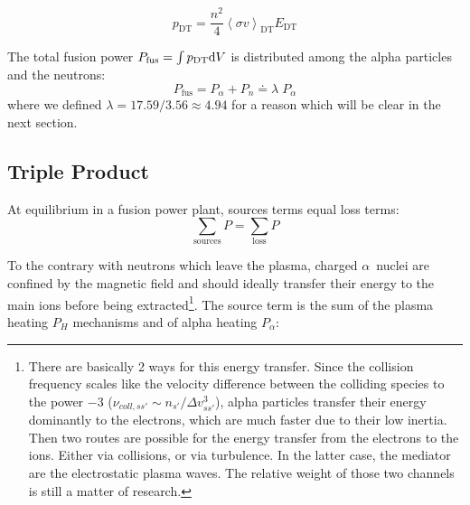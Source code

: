 \begin{equation}
p_{\mathrm{DT}} = 
	\frac{n^2}{4}  \left< \sigma v \right>_{\mathrm{DT}} E_{\mathrm{DT}}
	\label{eq:fusion_power}
\end{equation}

The total fusion power $P_{\mathrm{fus}}=\int p_{\mathrm{DT}} {\mathrm{d}} V$ is distributed among the alpha particles and the neutrons: 
\begin{equation}
P_{\mathrm{fus}}
= 
P_\alpha + P_n 
\doteq
\lambda \; P_\alpha
\label{eq:P_fus_Palpha}
\end{equation}
where we defined $\lambda = 17.59/3.56 \approx 4.94$ for a reason which will be clear in the next section.


%

\subsection{Triple Product}
At equilibrium in a fusion power plant, sources terms equal loss terms:
\begin{equation}
	\sum_{\mathrm{sources}} P = \sum_{\mathrm{loss}} P
	\label{eq:power_balance_general}
\end{equation}

To the contrary with neutrons which leave the plasma, charged $\alpha$~nuclei are confined by the magnetic field and should ideally transfer their energy to the main ions before being extracted\footnote{There are basically 2 ways for this energy transfer. Since the collision frequency scales like the velocity difference between the colliding species to the power $-3$ ($\nu_{coll,ss'}\sim n_{s'}/\Delta v_{ss'}^3$), alpha particles transfer their energy dominantly to the electrons, which are much faster due to their low inertia. Then two routes are possible for the energy transfer from the electrons to the ions. Either via collisions, or via turbulence. In the latter case, the mediator are the electrostatic plasma waves. The relative weight of those two channels is still a matter of research.}. The source term is the sum of the plasma heating $P_{H}$ mechanisms and of alpha heating $P_\alpha$:

